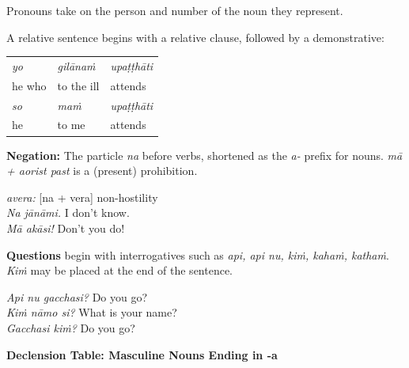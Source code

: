 \documentclass[11pt,oneside]{memoir}
\begin{document}
Pronouns take on the person and number of the noun they represent.

\clearpage

A relative sentence begins with a relative clause, followed by a demonstrative:

\begin{center}
\begin{tabular}{lll}
\emph{yo} & \emph{gilānaṁ} & \emph{upaṭṭhāti}\\[0pt]
he who & to the ill & attends\\[0pt]
\emph{so} & \emph{maṁ} & \emph{upaṭṭhāti}\\[0pt]
he & to me & attends\\[0pt]
\end{tabular}
\end{center}

\bigskip

\begin{multicols}{2}

\textbf{Negation:} The particle \emph{na} before verbs, shortened as the \emph{a-} prefix for
nouns. \emph{mā + aorist past} is a (present) prohibition.

\emph{avera:} [na + vera] non-hostility \\[0pt]
\emph{Na jānāmi.} I don't know. \\[0pt]
\emph{Mā akāsi!} Don't you do!

\columnbreak

\textbf{Questions} begin with interrogatives such as \emph{api, api nu, kiṁ, kahaṁ, kathaṁ}.
\emph{Kiṁ} may be placed at the end of the sentence.

\emph{Api nu gacchasi?} Do you go?\\[0pt]
\emph{Kiṁ nāmo si?} What is your name?\\[0pt]
\emph{Gacchasi kiṁ?} Do you go?

\end{multicols}

\textbf{Declension Table: Masculine Nouns Ending in -a}
\end{document}
